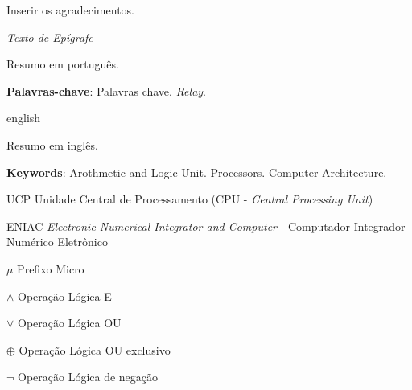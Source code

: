 \documentclass[
	12pt,				%
	openright,			%
	oneside,			%
	a4paper,			%
	chapter=TITLE,		%
	english,			%
	brazil,				%
	]{abntex2}
\begin{document}
\begin{agradecimentos}
	Inserir os agradecimentos.	
\end{agradecimentos}

\begin{epigrafe}
	\vspace*{\fill}
	\begin{flushright}
		\textit{Texto de Epígrafe}
	\end{flushright}
\end{epigrafe}


\setlength{\absparsep}{18pt} %
\begin{resumo}

Resumo em português.

	\textbf{Palavras-chave}: Palavras chave. \textit{Relay}.
\end{resumo}

\begin{resumo}[Abstract]
	\begin{otherlanguage*}{english}

Resumo em inglês.
		
		\vspace{\onelineskip}
		
		\noindent 
		\textbf{Keywords}: Arothmetic and Logic Unit. Processors. Computer Architecture.
	\end{otherlanguage*}
\end{resumo}


\listoffigures*
\cleardoublepage

\listoftables*
\cleardoublepage

\begin{siglas}
	\item[UCP] Unidade Central de Processamento (CPU - \textit{Central Processing Unit})
	\item[ENIAC] \textit{Electronic Numerical Integrator and Computer} - Computador Integrador Numérico Eletrônico
\end{siglas}

\begin{simbolos}
  \item[$ \mu $] Prefixo Micro
  \item[$ \wedge $] Operação Lógica E
  \item[$ \lor $] Operação Lógica OU
  \item[$ \oplus $] Operação Lógica OU exclusivo  
  \item[$ \lnot $] Operação Lógica de negação
\end{simbolos}
\end{document}
